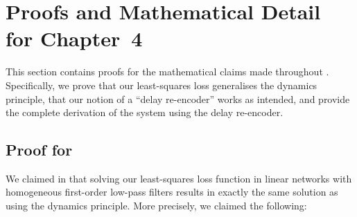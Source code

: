 
\section{Proofs and Mathematical Detail for Chapter~4}
\label{app:temporal_tuning_proofs}

This section contains proofs for the mathematical claims made throughout .
Specifically, we prove that our least-squares loss generalises the \NEF dynamics principle, that our notion of a \enquote{delay re-encoder} works as intended, and provide the complete derivation of the \LDN system using the delay re-encoder.

\subsection{Proof for }
\label{app:lstsq_nef_equivalence}

We claimed in  that solving our least-squares loss function in linear networks with homogeneous first-order low-pass filters results in exactly the same solution as using the \NEF dynamics principle.
More precisely, we claimed the following:

\thmTemporalLstsq*

